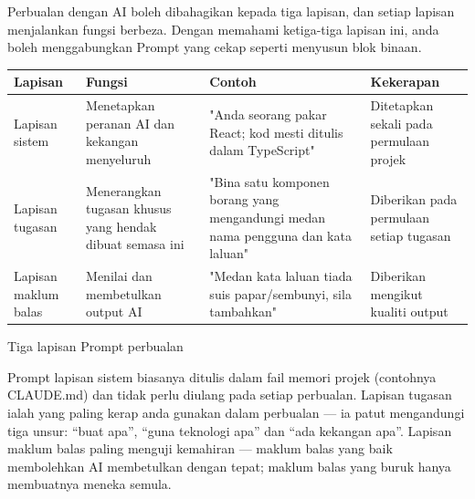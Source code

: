 


Perbualan dengan AI boleh dibahagikan kepada tiga lapisan, dan setiap lapisan menjalankan fungsi berbeza. Dengan memahami ketiga-tiga lapisan ini, anda boleh menggabungkan Prompt yang cekap seperti menyusun blok binaan.

\begin{center}
\begin{tabularx}{\linewidth}{|X|X|X|X|}
\hline
\textbf{Lapisan} & \textbf{Fungsi} & \textbf{Contoh} & \textbf{Kekerapan} \tabularnewline
\hline
Lapisan sistem & Menetapkan peranan AI dan kekangan menyeluruh & "Anda seorang pakar React; kod mesti ditulis dalam TypeScript" & Ditetapkan sekali pada permulaan projek \tabularnewline
Lapisan tugasan & Menerangkan tugasan khusus yang hendak dibuat semasa ini & "Bina satu komponen borang yang mengandungi medan nama pengguna dan kata laluan" & Diberikan pada permulaan setiap tugasan \tabularnewline
Lapisan maklum balas & Menilai dan membetulkan output AI & "Medan kata laluan tiada suis papar/sembunyi, sila tambahkan" & Diberikan mengikut kualiti output \tabularnewline
\hline
\end{tabularx}
\end{center}

\begin{center}\small\color{gray}Tiga lapisan Prompt perbualan\end{center}

Prompt lapisan sistem biasanya ditulis dalam fail memori projek (contohnya CLAUDE.md) dan tidak perlu diulang pada setiap perbualan. Lapisan tugasan ialah yang paling kerap anda gunakan dalam perbualan — ia patut mengandungi tiga unsur: “buat apa”, “guna teknologi apa” dan “ada kekangan apa”. Lapisan maklum balas paling menguji kemahiran — maklum balas yang baik membolehkan AI membetulkan dengan tepat; maklum balas yang buruk hanya membuatnya meneka semula.

